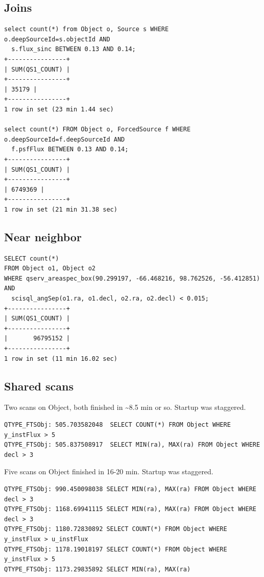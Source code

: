 \documentclass[DM,toc]{lsstdoc}
\begin{document}
\subsection{Joins}\label{joins}

\begin{verbatim}
select count(*) from Object o, Source s WHERE o.deepSourceId=s.objectId AND
  s.flux_sinc BETWEEN 0.13 AND 0.14;
+----------------+
| SUM(QS1_COUNT) |
+----------------+
| 35179 |
+----------------+
1 row in set (23 min 1.44 sec)
 
select count(*) FROM Object o, ForcedSource f WHERE o.deepSourceId=f.deepSourceId AND
  f.psfFlux BETWEEN 0.13 AND 0.14;
+----------------+
| SUM(QS1_COUNT) |
+----------------+
| 6749369 |
+----------------+
1 row in set (21 min 31.38 sec)
\end{verbatim}

\subsection{Near neighbor}\label{near-neighbor}

\begin{verbatim}
SELECT count(*)
FROM Object o1, Object o2
WHERE qserv_areaspec_box(90.299197, -66.468216, 98.762526, -56.412851) AND
  scisql_angSep(o1.ra, o1.decl, o2.ra, o2.decl) < 0.015;
+----------------+
| SUM(QS1_COUNT) |
+----------------+
|       96795152 |
+----------------+
1 row in set (11 min 16.02 sec)
\end{verbatim}

\subsection{Shared scans}\label{shared-scans}

Two scans on Object, both finished in \textasciitilde{}8.5 min or so.
Startup was staggered.

\begin{verbatim}
QTYPE_FTSObj: 505.703582048  SELECT COUNT(*) FROM Object WHERE y_instFlux > 5
QTYPE_FTSObj: 505.837508917  SELECT MIN(ra), MAX(ra) FROM Object WHERE decl > 3
\end{verbatim}

Five scans on Object finished in 16-20 min. Startup was staggered.

\begin{verbatim}
QTYPE_FTSObj: 990.450098038 SELECT MIN(ra), MAX(ra) FROM Object WHERE decl > 3
QTYPE_FTSObj: 1168.69941115 SELECT MIN(ra), MAX(ra) FROM Object WHERE decl > 3
QTYPE_FTSObj: 1180.72830892 SELECT COUNT(*) FROM Object WHERE y_instFlux > u_instFlux
QTYPE_FTSObj: 1178.19018197 SELECT COUNT(*) FROM Object WHERE y_instFlux > 5
QTYPE_FTSObj: 1173.29835892 SELECT MIN(ra), MAX(ra)
\end{verbatim}
\end{document}
